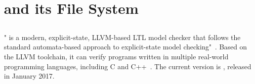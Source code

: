 \chapter{ \divine and its File System} \label{chap:divine}

\section{\divine}

" \divine is a modern, explicit-state, LLVM-based LTL model checker that follows the standard automata-based approach to explicit-state model checking"~\cite{Divine2}. Based on the LLVM toolchain, it can verify programs written in multiple real-world programming languages, including C and C++~\cite{Divine}. The current version is  , released in January 2017.

